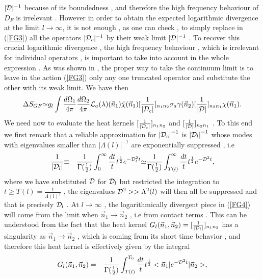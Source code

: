 \documentclass[a4paper,10pt]{article}
\begin{document}
$|{\cal D}|^{-1}$ because of its boundedness , and therefore the
high frequency behaviour of ${D}_{F}$ is irrelevant . However in
order to obtain the expected logarithmic divergence at the limit
$l{\longrightarrow}{\infty}$, it is not enough , as one can check
, to simply replace in (\ref{FG3}) all the operators $|{\cal
D}_{c}|^{-1}$ by their weak limit $|{\cal D}|^{-1}$ . To recover
this crucial logarithmic divergence , the high frequency
behaviour , which is irrelevant for individual operators , is
important to take into account in the whole expression . As was
shown in \cite{denjoe}, the proper way to take the continuum
limit is to leave in the action (\ref{FG3}) only any one
truncated operator and substitute the other with its weak limit.
We have then
\begin{eqnarray}
{\Delta}{S}_{GF}{\simeq}g_l\int
\frac{d{\Omega}_1}{4{\pi}}\frac{d{\Omega}_2}{4{\pi}}{\cal
L}_a({\lambda})(\vec{n}_1)\bar{\chi}(\vec{n}_1)[\frac{1}{|{\cal
D}_{c} |}]_{n_1n_2}{\sigma}_a{\gamma}(\vec{n}_2)[\frac{1}{|{\cal
D}|}]_{n_2n_1}{\chi}(\vec{n}_1).\label{FG4}
\end{eqnarray}
We need now to evaluate the heat kernels $[\frac{1}{|{\cal D}_{c}
|}]_{n_1n_2}$ and  $[\frac{1}{|{\cal D}|}]_{n_2n_1}$ . To this
end we first remark that a reliable approximation for ${|{\cal
D}_{c}|}^{-1}$ is ${|{\cal D}_{l}|}^{-1}$ whose modes with
eigenvalues smaller than ${|{\Lambda}(l)|}^{-1}$ are
exponentially suppressed , i.e \cite{denjoe}
\begin{eqnarray}
\frac{1}{|{\cal
D}_{l}|}&{\equiv}&\frac{1}{\Gamma(\frac{1}{2})}\int_{0}^{\infty}\frac{dt}{t}t^{\frac{1}{2}}e^{-{\cal
D}_{l}^2t}
{\simeq}\frac{1}{\Gamma(\frac{1}{2})}\int_{T(l)}^{\infty}\frac{dt}{t}t^{\frac{1}{2}}e^{-{\cal
D}^2t},
\end{eqnarray}
where we have substituted ${\cal D}$ for ${\cal D}_{l}$ but
restricted the integration to
$t{\geq}T(l)=\frac{1}{{\Lambda}(l)^2}$ , the eigenvalues ${\cal
D}^2>>{\Lambda}^2(l)$ will then all be suppressed and that is
precisely ${\cal D}_{l}$ . At $l{\longrightarrow}{\infty}$ , the
logarithmically divergent piece in (\ref{FG4}) will come from the
limit when $\vec{n}_1{\longrightarrow}\vec{n}_2$ , i.e from
contact terms . This can be understood from the fact that the
heat kernel $G_l(\vec{n}_1,\vec{n}_2)=[\frac{1}{|{\cal
D}_{l}|}]_{n_1n_2}$ has a singularity as
$\vec{n}_1{\longrightarrow}\vec{n}_2$ , which is coming from its
short time behavior \cite{heat} , and therefore this heat kernel
is effectively given by the integral
\begin{eqnarray}
G_l(\vec{n}_1,\vec{n}_2)&=&\frac{1}{{\Gamma}(\frac{1}{2})}\int_{T(l)}^{T_0}\frac{dt}{t}t^{\frac{1}{2}}<\vec{n}_1|e^{-{\cal
D}^2t}|\vec{n}_2>,
\end{eqnarray}
\end{document}
